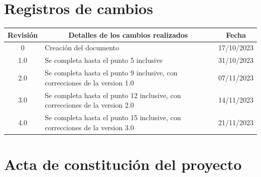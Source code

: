 \documentclass[
11pt, %
]{charter}
\begin{document}
\maketitle
\thispagestyle{empty}
\pagebreak


\thispagestyle{empty}
{\setlength{\parskip}{0pt}
\tableofcontents{}
}
\pagebreak


\section*{Registros de cambios}
\label{sec:registro}


\begin{table}[ht]
\label{tab:registro}
\centering
\begin{tabularx}{\linewidth}{@{}|c|X|c|@{}}
\hline
\rowcolor[HTML]{C0C0C0} 
Revisión & \multicolumn{1}{c|}{\cellcolor[HTML]{C0C0C0}Detalles de los cambios realizados} & Fecha      \\ \hline
 0      & Creación del documento                                 & 17/10/2023 \\ \hline
1.0      & Se completa hasta el punto 5 inclusive                & 31/10/2023 \\ \hline
2.0      & Se completa hasta el punto 9 inclusive, con correcciones de la version 1.0               & 07/11/2023 \\ \hline
3.0      & Se completa hasta el punto 12 inclusive, con correcciones de la version 2.0               & 14/11/2023 \\ \hline
4.0      & Se completa hasta el punto 15 inclusive, con correcciones de la version 3.0               & 21/11/2023 \\ \hline
\end{tabularx}
\end{table}

\pagebreak



\section*{Acta de constitución del proyecto}
\label{sec:acta}
\end{document}

